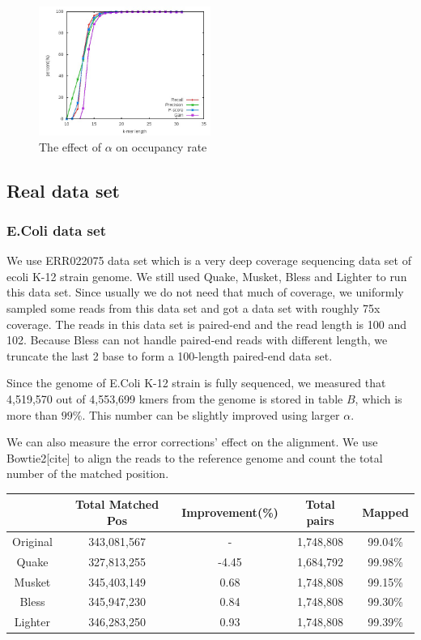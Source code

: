 \documentclass[10pt]{article}
\begin{document}
\begin{figure}[h!]
\begin{center}
\includegraphics[width=0.5\textwidth]{kmerLength.jpg}
\caption{The effect of $\alpha$ on occupancy rate\label{fig:kmerLength}}
\end{center}
\end{figure}


\subsection*{Real data set}
\subsubsection*{E.Coli data set}
We use ERR022075 data set which is a very deep coverage sequencing data set of ecoli K-12 strain genome. We still used Quake, Musket, Bless and Lighter to run this data set. Since usually we do not need that much of coverage, we uniformly sampled some reads from this data set and got a data set with roughly 75x coverage. The reads in this data set is paired-end and the read length is 100 and 102. Because Bless can not handle paired-end reads with different length, we truncate the last 2 base to form a 100-length paired-end data set.

Since the genome of E.Coli K-12 strain is fully sequenced, we measured that 4,519,570 out of 4,553,699 kmers from the genome is stored in table $B$, which is more than $99\%$. This number can be slightly improved using larger $\alpha$. 
 
We can also measure the error corrections' effect on the alignment. We use Bowtie2[cite] to align the reads to the reference genome and count the total number of the matched position.

\begin{tabular}{|c|c|c|c|c|}\hline
  & Total Matched Pos & Improvement(\%) & Total pairs & Mapped \\ \hline
Original	& 343,081,567	& - & 1,748,808	& 99.04\% \\ \hline
Quake	& 327,813,255	& -4.45	& 1,684,792	& 99.98\% \\ \hline
Musket	& 345,403,149	& 0.68	& 1,748,808	& 99.15\% \\ \hline
Bless	& 345,947,230	& 0.84	& 1,748,808	& 99.30\% \\ \hline
Lighter	&  346,283,250 & 0.93	& 1,748,808	& 99.39\% \\ \hline
\end{tabular}
\end{document}
